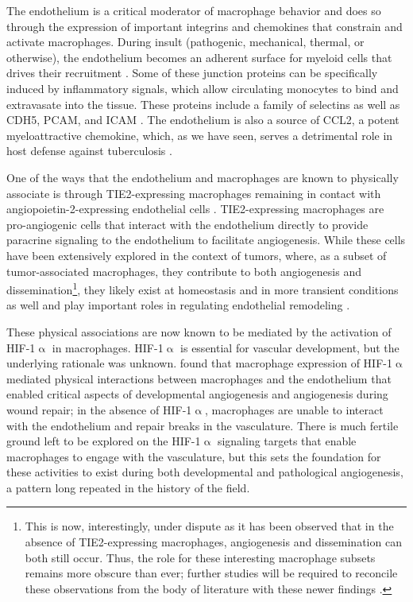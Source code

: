 The endothelium is a critical moderator of macrophage behavior and does so through the expression of important integrins and chemokines that constrain and activate macrophages. During insult (pathogenic, mechanical, thermal, or otherwise), the endothelium becomes an adherent surface for myeloid cells that drives their recruitment \citep{Kalucka2017}. Some of these junction proteins can be specifically induced by inflammatory signals, which allow circulating monocytes to bind and extravasate into the tissue. These proteins include a family of selectins as well as CDH5, PCAM, and ICAM \citep{Imhof2004}. The endothelium is also a source of CCL2, a potent myeloattractive chemokine, which, as we have seen, serves a detrimental role in host defense against tuberculosis \citep{Martin2007, Cambier2014b}. 

One of the ways that the endothelium and macrophages are known to physically associate is through TIE2\hyp{}expressing macrophages remaining in contact with angiopoietin\hyp{}2\hyp{}expressing endothelial cells \citep{Baer2013, DePalma2007, DePalma2011}. TIE2\hyp{}expressing macrophages are pro\hyp{}angiogenic cells that interact with the endothelium directly to provide paracrine signaling to the endothelium to facilitate angiogenesis. While these cells have been extensively explored in the context of tumors, where, as a subset of tumor\hyp{}associated macrophages, they contribute to both angiogenesis and dissemination\footnote{This is now, interestingly, under dispute as it has been observed that in the absence of TIE2\hyp{}expressing macrophages, angiogenesis and dissemination can both still occur. Thus, the role for these interesting macrophage subsets remains more obscure than ever; further studies will be required to reconcile these observations from the body of literature with these newer findings \citep{Jakab2022}.}, they likely exist at homeostasis and in more transient conditions as well and play important roles in regulating endothelial remodeling \citep{Duran2021, Lewis2007}.

These physical associations are now known to be mediated by the activation of HIF\hyp{}1$\upalpha$ in macrophages. HIF\hyp{}1$\upalpha$ is essential for vascular development, but the underlying rationale was unknown. \citet{Gerri2017} found that macrophage expression of HIF\hyp{}1$\upalpha$ mediated physical interactions between macrophages and the endothelium that enabled critical aspects of developmental angiogenesis and angiogenesis during wound repair; in the absence of HIF\hyp{}1$\upalpha$, macrophages are unable to interact with the endothelium and repair breaks in the vasculature. There is much fertile ground left to be explored on the HIF\hyp{}1$\upalpha$ signaling targets that enable macrophages to engage with the vasculature, but this sets the foundation for these activities to exist during both developmental and pathological angiogenesis, a pattern long repeated in the history of the field.

